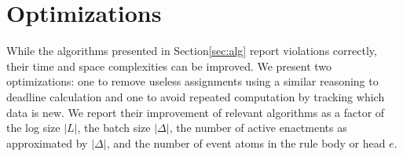\long{}

\section{Optimizations}
\label{sec:opt}

While the algorithms presented in Section\:\ref{sec:alg}
report violations correctly,
their time and space complexities can be improved.
We present two optimizations:
one to remove useless assignments
using a similar reasoning to deadline calculation
and one to avoid repeated computation
by tracking which data is new.
We report their improvement
of relevant algorithms
as a factor of the log size $|L|$,
the batch size $|\Delta|$,
the number of active enactments as approximated by $|\Delta|$,
and the number of event atoms in the rule body or head $e$.


